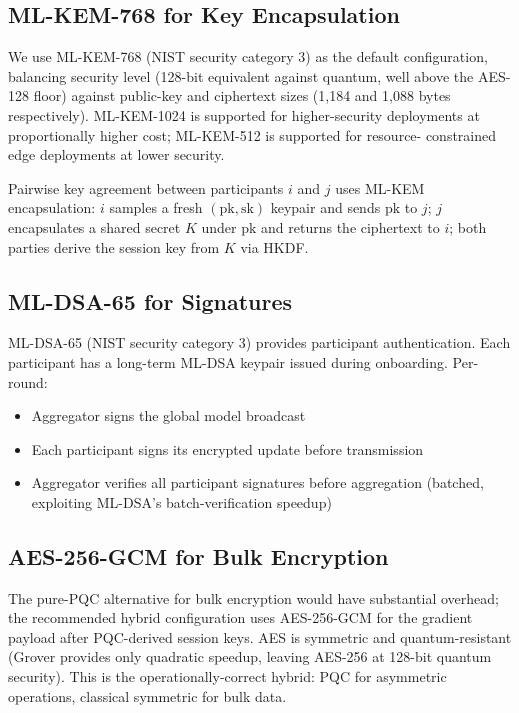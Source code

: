\documentclass[sigconf,nonacm]{acmart}
\begin{document}
\subsection{ML-KEM-768 for Key Encapsulation}

We use ML-KEM-768 (NIST security category 3) as the default
configuration, balancing security level (128-bit equivalent against
quantum, well above the AES-128 floor) against public-key and
ciphertext sizes (1{,}184 and 1{,}088 bytes respectively).
ML-KEM-1024 is supported for higher-security deployments at
proportionally higher cost; ML-KEM-512 is supported for resource-
constrained edge deployments at lower security.

Pairwise key agreement between participants $i$ and $j$ uses
ML-KEM encapsulation: $i$ samples a fresh
$(\text{pk}, \text{sk})$ keypair and sends $\text{pk}$ to $j$;
$j$ encapsulates a shared secret $K$ under $\text{pk}$ and returns
the ciphertext to $i$; both parties derive the session key from $K$
via HKDF.

\subsection{ML-DSA-65 for Signatures}

ML-DSA-65 (NIST security category 3) provides participant
authentication. Each participant has a long-term ML-DSA keypair
issued during onboarding. Per-round:

\begin{itemize}
  \item Aggregator signs the global model broadcast
  \item Each participant signs its encrypted update before
        transmission
  \item Aggregator verifies all participant signatures before
        aggregation (batched, exploiting ML-DSA's batch-verification
        speedup)
\end{itemize}

\subsection{AES-256-GCM for Bulk Encryption}

The pure-PQC alternative for bulk encryption would have
substantial overhead; the recommended hybrid configuration uses
AES-256-GCM for the gradient payload after PQC-derived session
keys. AES is symmetric and quantum-resistant (Grover provides only
quadratic speedup, leaving AES-256 at 128-bit quantum security).
This is the operationally-correct hybrid: PQC for asymmetric
operations, classical symmetric for bulk data.
\end{document}
